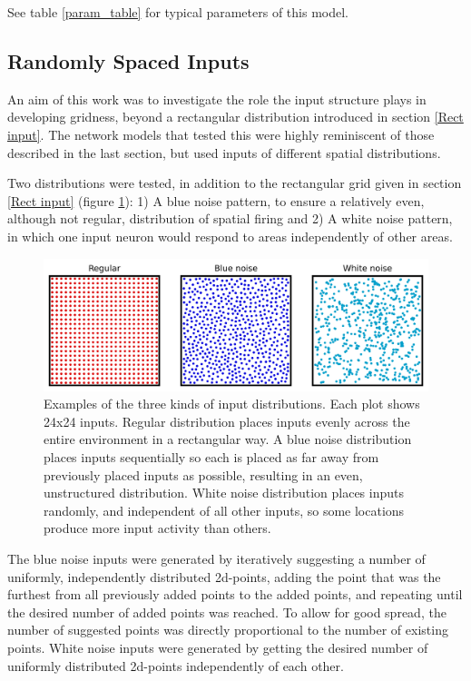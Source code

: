 \documentclass{article}
\begin{document}
    See table \ref{param_table} for typical parameters of this model.

    \subsection{Randomly Spaced Inputs} \label{Rand input}
    An aim of this work was to investigate the role the input structure plays in developing gridness, beyond a rectangular distribution introduced in section \ref{Rect input}. The network models that tested this were highly reminiscent of those described in the last section, but used inputs of different spatial distributions.
    
    Two distributions were tested, in addition to the rectangular grid given in section \ref{Rect input} (figure \ref{input_distribution}): 1) A blue noise pattern, to ensure a relatively even, although not regular, distribution of spatial firing and 2) A white noise pattern, in which one input neuron would respond to areas independently of other areas.

    \begin{figure}[H]
        \centering
        \begin{minipage}[t]{1\textwidth}
            \includegraphics[width=\textwidth]{distribution_plot.png}
        \end{minipage}
        \caption{Examples of the three kinds of input distributions. Each plot shows 24x24 inputs. Regular distribution places inputs evenly across the entire environment in a rectangular way. A blue noise distribution places inputs sequentially so each is placed as far away from previously placed inputs as possible, resulting in an even, unstructured distribution. White noise distribution places inputs randomly, and independent of all other inputs, so some locations produce more input activity than others.}
        \label{input_distribution}
    \end{figure}
    
    The blue noise inputs were generated by iteratively suggesting a number of uniformly, independently distributed 2d-points, adding the point that was the furthest from all previously added points to the added points, and repeating until the desired number of added points was reached. To allow for good spread, the number of suggested points was directly proportional to the number of existing points.
    White noise inputs were generated by getting the desired number of uniformly distributed 2d-points independently of each other.
\end{document}
